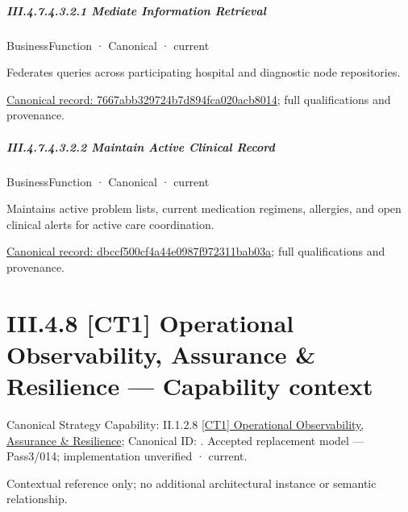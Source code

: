 \subparagraph*{III.4.7.4.3.2.1 Mediate Information Retrieval}
\label{navigation:III.4.7.4.3.2.1}

\label{element:7667abb329724b7d894fca020acb8014}
{\small BusinessFunction · Canonical · current}\par

Federates queries across participating hospital and diagnostic node repositories.


{\footnotesize \href{../../../../../../../continuum/business/business-function/7667abb329724b7d894fca020acb8014.md}{Canonical record: 7667abb329724b7d894fca020acb8014}; full qualifications and provenance.}\par
\subparagraph*{III.4.7.4.3.2.2 Maintain Active Clinical Record}
\label{navigation:III.4.7.4.3.2.2}

\label{element:dbccf500cf4a44e0987f972311bab03a}
{\small BusinessFunction · Canonical · current}\par

Maintains active problem lists, current medication regimens, allergies, and open clinical alerts for active care coordination.


{\footnotesize \href{../../../../../../../continuum/business/business-function/dbccf500cf4a44e0987f972311bab03a.md}{Canonical record: dbccf500cf4a44e0987f972311bab03a}; full qualifications and provenance.}\par
\section*{III.4.8 [CT1] Operational Observability, Assurance \& Resilience — Capability context}
\label{navigation:III.4.8}

{\small Canonical Strategy Capability: II.1.2.8 \hyperref[element:209359b883df42379e7b1c44e65437d8]{[CT1] Operational Observability, Assurance \& Resilience}; Canonical ID: \texttt{}. Accepted replacement model — Pass3/014; implementation unverified · current.}\par
Contextual reference only; no additional architectural instance or semantic relationship.\par
